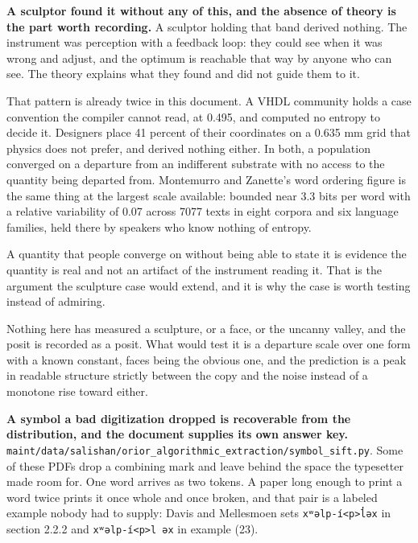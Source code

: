 \textbf{A sculptor found it without any of this, and the absence of theory is the part worth recording.} A sculptor holding that band derived nothing. The instrument was perception with a feedback loop: they could see when it was wrong and adjust, and the optimum is reachable that way by anyone who can see. The theory explains what they found and did not guide them to it.

That pattern is already twice in this document. A VHDL community holds a case convention the compiler cannot read, at 0.495, and computed no entropy to decide it. Designers place 41 percent of their coordinates on a 0.635 mm grid that physics does not prefer, and derived nothing either. In both, a population converged on a departure from an indifferent substrate with no access to the quantity being departed from. Montemurro and Zanette's word ordering figure is the same thing at the largest scale available: bounded near 3.3 bits per word with a relative variability of 0.07 across 7077 texts in eight corpora and six language families, held there by speakers who know nothing of entropy.

A quantity that people converge on without being able to state it is evidence the quantity is real and not an artifact of the instrument reading it. That is the argument the sculpture case would extend, and it is why the case is worth testing instead of admiring.

Nothing here has measured a sculpture, or a face, or the uncanny valley, and the posit is recorded as a posit. What would test it is a departure scale over one form with a known constant, faces being the obvious one, and the prediction is a peak in readable structure strictly between the copy and the noise instead of a monotone rise toward either.

\textbf{A symbol a bad digitization dropped is recoverable from the distribution, and the document supplies its own answer key.} \texttt{maint/\allowbreak{}data/\allowbreak{}salishan/\allowbreak{}orior\_\allowbreak{}algorithmic\_\allowbreak{}extraction/\allowbreak{}symbol\_\allowbreak{}sift.\allowbreak{}py}. Some of these PDFs drop a combining mark and leave behind the space the typesetter made room for. One word arrives as two tokens. A paper long enough to print a word twice prints it once whole and once broken, and that pair is a labeled example nobody had to supply: Davis and Mellesmoen sets \texttt{xʷəlp-\allowbreak{}í<p>l̓əx} in section 2.2.2 and \texttt{xʷəlp-\allowbreak{}í<p>l əx} in example (23).

